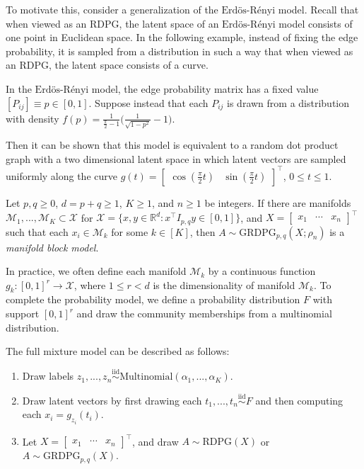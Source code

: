 \documentclass[12pt]{article}
\providecommand{\tightlist}{%
  \setlength{\itemsep}{0pt}\setlength{\parskip}{0pt}}
\begin{document}
To motivate this, consider a generalization of the
\(\text{Erd\"{o}s-R\'{e}nyi}\) model. Recall that when viewed as an
RDPG, the latent space of an \(\text{Erd\"{o}s-R\'{e}nyi}\) model
consists of one point in Euclidean space. In the following example,
instead of fixing the edge probability, it is sampled from a
distribution in such a way that when viewed as an RDPG, the latent space
consists of a curve.

\begin{example}
In the $\text{Erd\"{o}s-R\'{e}nyi}$ model, the edge probability matrix has a fixed value $[P_{ij}] \equiv p \in [0, 1]$. 
Suppose instead that each $P_{ij}$ is drawn from a distribution with density $f(p) = \frac{1}{\frac{\pi}{2} - 1} \Big(\frac{1}{\sqrt{1 - p^2}} - 1 \Big)$. 

Then it can be shown that this model is equivalent to a random dot product graph with a two dimensional latent space in which latent vectors are sampled uniformly along the curve $g(t) = \begin{bmatrix} \cos(\frac{\pi}{2} t) & \sin(\frac{\pi}{2} t) \end{bmatrix}^\top$, $0 \leq t \leq 1$. 
\end{example}

\begin{definition}
Let $p, q \geq 0$, $d = p + q \geq 1$, $K \geq 1$, and $n \geq 1$ be integers.
If there are manifolds $\mathcal{M}_1, ..., \mathcal{M}_K \subset \mathcal{X}$ for $\mathcal{X} = \{x, y \in \mathbb{R}^d : x^\top I_{p,q} y \in [0, 1] \}$, and 
$X = \begin{bmatrix} x_1 & \cdots & x_n \end{bmatrix}^\top$ such that each $x_i \in \mathcal{M}_k$ for some $k \in [K]$, then $A \sim \mathrm{GRDPG}_{p,q}(X; \rho_n)$ is a \emph{manifold block model}.
\end{definition}

In practice, we often define each manifold \(\mathcal{M}_k\) by a
continuous function \(g_k : [0, 1]^r \to \mathcal{X}\), where
\(1 \leq r < d\) is the dimensionality of manifold \(\mathcal{M}_k\). To
complete the probability model, we define a probability distribution
\(F\) with support \([0, 1]^r\) and draw the community memberships from
a multinomial distribution.

The full mixture model can be described as follows:

\begin{enumerate}
\def\labelenumi{\arabic{enumi}.}
\tightlist
\item
  Draw labels
  \(z_1, ..., z_n \stackrel{\mathrm{iid}}{\sim}\mathrm{Multinomial}(\alpha_1, ..., \alpha_K)\).
\item
  Draw latent vectors by first drawing each
  \(t_1, ..., t_n \stackrel{\mathrm{iid}}{\sim}F\) and then computing
  each \(x_i = g_{z_i}(t_i)\).
\item
  Let \(X = \begin{bmatrix} x_1 & \cdots & x_n \end{bmatrix}^\top\), and
  draw \(A \sim \mathrm{RDPG}(X)\) or
  \(A \sim \mathrm{GRDPG}_{p,q}(X)\).
\end{enumerate}
\end{document}
